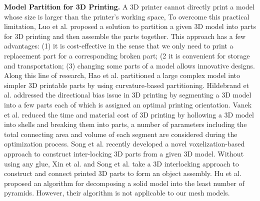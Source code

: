 \textbf{Model Partition for 3D Printing.} A 3D printer cannot directly print a model whose size is larger than the printer's working space, To overcome this practical limitation, Luo et al. \cite{LuoBRM12} proposed a solution to partition a given 3D model into parts for 3D printing and then assemble the parts together. This approach has a few advantages: (1) it is cost-effective in the sense that we only need to print a replacement part for a corresponding broken part; (2 it is convenient for storage and transportation; (3) changing some parts of a model allows innovative designs. Along this line of research, Hao et al. \cite{hao2011efficient} partitioned a large complex model into simpler 3D printable parts by using curvature-based partitioning. Hildebrand et al. \cite{HildebrandBA13} addressed the directional bias issue in 3D printing by segmenting a 3D model into a few parts each of which is assigned an optimal printing orientation. Vanek et al. \cite{VanekGBMCSM14} reduced the time and material cost of 3D printing by hollowing a 3D model into shells and breaking them into parts, a number of parameters including the total connecting area and volume of each segment are considered during the optimization process. Song et al. \cite{SongFLF15} recently developed a novel voxelization-based approach to construct inter-locking 3D parts from a given 3D model. Without using any glue, Xin et al. \cite{XinLFWHC11} and Song et al. \cite{SongFC12} take a 3D interlocking approach to construct and connect printed 3D parts to form an object assembly. Hu et al. \cite{Hu_siga14} proposed an algorithm for decomposing a solid model into the least number of pyramids. However, their algorithm is not applicable to our mesh models.
